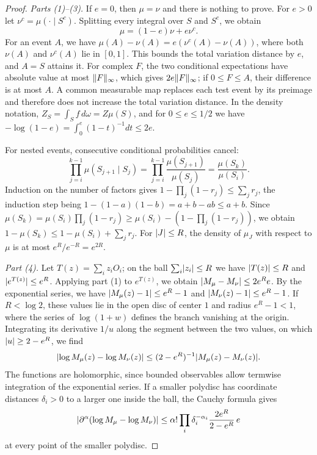 \begin{proof}
\emph{Parts (1)--(3).} If $e=0$, then $\mu=\nu$ and there is nothing to prove. For $e>0$ let $\nu^c=\mu(\cdot\mid S^c)$. Splitting every integral over $S$ and $S^c$, we obtain
\begin{equation}\label{ch02:eq:conditioning-mixture}
 \mu=(1-e)\nu+e\nu^c.
\end{equation}
For an event $A$, we have $\mu(A)-\nu(A)=e(\nu^c(A)-\nu(A))$, where both $\nu(A)$ and $\nu^c(A)$ lie in $[0,1]$. This bounds the total variation distance by $e$, and $A=S$ attains it. For complex $F$, the two conditional expectations have absolute value at most $\lVert F\rVert_\infty$, which gives $2e\lVert F\rVert_\infty$; if $0\le F\le A$, their difference is at most $A$. A common measurable map replaces each test event by its preimage and therefore does not increase the total variation distance. In the density notation, $Z_S=\int_Sf\,d\omega=Z\mu(S)$, and for $0\le e\le1/2$ we have $-\log(1-e)=\int_0^e(1-t)^{-1}dt\le2e$.

For nested events, consecutive conditional probabilities cancel:
\[
 \prod_{j=i}^{k-1}\mu(S_{j+1}\mid S_j)=\prod_{j=i}^{k-1}\frac{\mu(S_{j+1})}{\mu(S_j)}=\frac{\mu(S_k)}{\mu(S_i)}.
\]
Induction on the number of factors gives $1-\prod_j(1-r_j)\le\sum_jr_j$, the induction step being $1-(1-a)(1-b)=a+b-ab\le a+b$. Since $\mu(S_k)=\mu(S_i)\prod_j(1-r_j)\ge\mu(S_i)-(1-\prod_j(1-r_j))$, we obtain $1-\mu(S_k)\le1-\mu(S_i)+\sum_jr_j$. For $\lvert J\rvert\le R$, the density of $\mu_J$ with respect to $\mu$ is at most $e^R/e^{-R}=e^{2R}$.

\emph{Part (4).} Let $T(z)=\sum_iz_iO_i$; on the ball $\sum_i\lvert z_i\rvert\le R$ we have $\lvert T(z)\rvert\le R$ and $\lvert e^{T(z)}\rvert\le e^R$. Applying part (1) to $e^{T(z)}$, we obtain $\lvert M_\mu-M_\nu\rvert\le2e^Re$. By the exponential series, we have $\lvert M_\mu(z)-1\rvert\le e^R-1$ and $\lvert M_\nu(z)-1\rvert\le e^R-1$. If $R<\log2$, these values lie in the open disc of center $1$ and radius $e^R-1<1$, where the series of $\log(1+w)$ defines the branch vanishing at the origin. Integrating its derivative $1/u$ along the segment between the two values, on which $\lvert u\rvert\ge2-e^R$, we find
\[
 \lvert \log M_\mu(z)-\log M_\nu(z)\rvert\le(2-e^R)^{-1}\lvert M_\mu(z)-M_\nu(z)\rvert.
\]
The functions are holomorphic, since bounded observables allow termwise integration of the exponential series. If a smaller polydisc has coordinate distances $\delta_i>0$ to a larger one inside the ball, the Cauchy formula gives
\[
 \lvert \partial^\alpha(\log M_\mu-\log M_\nu)\rvert\le\alpha!\prod_i\delta_i^{-\alpha_i}\frac{2e^R}{2-e^R}\,e
\]
at every point of the smaller polydisc.


\end{proof}
